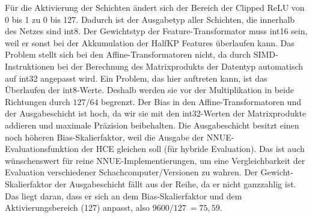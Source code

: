 \begin{table}[ht]
  \caption{Skalierfaktor und Datentypen für Gewichte und Bias des \acp{NNUE} sowie Ausgabetyp der Schichten. Basierend auf Werten der Stockfish \ac{NNUE} Implementierung \cite{StockfishNNUE}}
  \label{table:netQuantization}
  \renewcommand{\arraystretch}{1.2}
  \centering
  \sffamily
  \begin{footnotesize}
  \end{footnotesize}
  \rmfamily
\end{table}

Für die Aktivierung der Schichten ändert sich der Bereich der Clipped \ac{ReLU} von 0 bis 1 zu 0 bis 127. Dadurch ist der Ausgabetyp aller Schichten, die innerhalb des Netzes sind int8. Der Gewichtstyp der Feature-Transformator muss int16 sein, weil er sonst bei der Akkumulation der HalfKP Features überlaufen kann. Das Problem stellt sich bei den Affine-Transformatoren nicht, da durch \ac{SIMD}-Instruktionen bei der Berechnung des Matrixprodukts der Datentyp automatisch auf int32 angepasst wird. Ein Problem, das hier auftreten kann, ist das Überlaufen der int8-Werte. Deshalb werden sie vor der Multiplikation in beide Richtungen durch $127/64$ begrenzt. Der Bias in den Affine-Transformatoren und der Ausgabeschicht ist hoch, da wir sie mit den int32-Werten der Matrixprodukte addieren und maximale Präzision beibehalten. Die Ausgabeschicht besitzt einen noch höheren Bias-Skalierfaktor, weil die Ausgabe der \ac{NNUE}-Evaluationsfunktion der \ac{HCE} gleichen soll (für hybride Evaluation). Das ist auch wünschenswert für reine \ac{NNUE}-Implementierungen, um eine Vergleichbarkeit der Evaluation verschiedener Schachcomputer/Versionen zu wahren. Der Gewicht-Skalierfaktor der Ausgabeschicht fällt aus der Reihe, da er nicht ganzzahlig ist. Das liegt daran, dass er sich an dem Bias-Skalierfaktor und dem Aktivierungsbereich (127) anpasst, also $9600/127~=75,59$.

